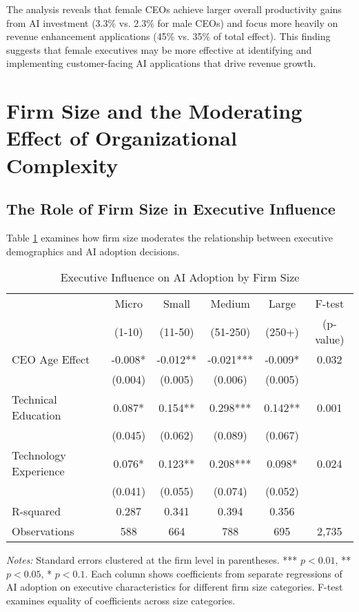 \documentclass[12pt, a4paper]{article}
\begin{document}
The analysis reveals that female CEOs achieve larger overall productivity gains from AI investment (3.3\% vs. 2.3\% for male CEOs) and focus more heavily on revenue enhancement applications (45\% vs. 35\% of total effect). This finding suggests that female executives may be more effective at identifying and implementing customer-facing AI applications that drive revenue growth.

\section{Firm Size and the Moderating Effect of Organizational Complexity}

\subsection{The Role of Firm Size in Executive Influence}

Table \ref{tab:size_moderation} examines how firm size moderates the relationship between executive demographics and AI adoption decisions.

\begin{table}[H]
\centering
\caption{Executive Influence on AI Adoption by Firm Size}
\label{tab:size_moderation}
\begin{tabular}{lccccc}
\toprule
 & Micro & Small & Medium & Large & F-test \\
 & (1-10) & (11-50) & (51-250) & (250+) & (p-value) \\
\midrule
CEO Age Effect & -0.008* & -0.012** & -0.021*** & -0.009* & 0.032 \\
 & (0.004) & (0.005) & (0.006) & (0.005) & \\
Technical Education & 0.087* & 0.154** & 0.298*** & 0.142** & 0.001 \\
 & (0.045) & (0.062) & (0.089) & (0.067) & \\
Technology Experience & 0.076* & 0.123** & 0.208*** & 0.098* & 0.024 \\
 & (0.041) & (0.055) & (0.074) & (0.052) & \\
\midrule
R-squared & 0.287 & 0.341 & 0.394 & 0.356 & \\
Observations & 588 & 664 & 788 & 695 & 2,735 \\
\bottomrule
\end{tabular}
\begin{minipage}{\textwidth}
\footnotesize
\textit{Notes:} Standard errors clustered at the firm level in parentheses. *** $p<0.01$, ** $p<0.05$, * $p<0.1$. Each column shows coefficients from separate regressions of AI adoption on executive characteristics for different firm size categories. F-test examines equality of coefficients across size categories.
\end{minipage}
\end{table}
\end{document}
